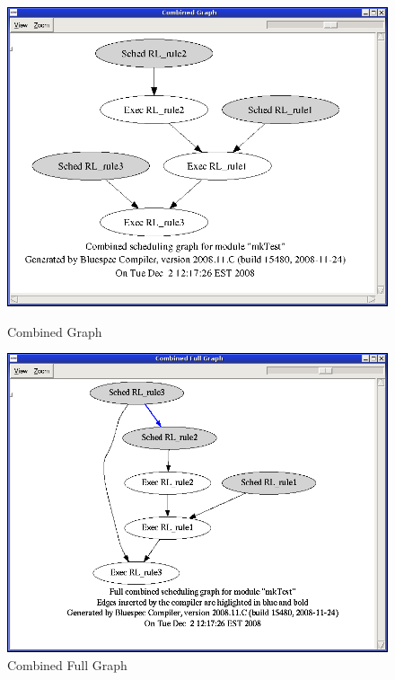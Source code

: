 \documentclass{article}
\begin{document}
\begin{figure}
\begin{minipage}[ht]{3 in}
\begin{center}
\includegraphics[width = 3 in]{figures/combinedgraph}
\caption{Combined Graph}
\label{fig-combinedgraph}
\end{center}
\end{minipage}
\hspace{.3 in}
\begin{minipage}[ht]{3 in}
\begin{center}
\includegraphics[width = 3 in]{figures/combinedfullgraph}
\caption{Combined Full Graph}
\label{fig-combinedfullgraph}
\end{center}
\end{minipage}
\end{figure}




\end{document}
